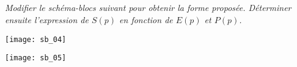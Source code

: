 \begin{multicols}{2}
\subparagraph*{}
\textit{Modifier le schéma-blocs suivant pour obtenir la forme proposée. Déterminer ensuite l'expression de $S(p)$ en fonction de $E(p)$ et $P(p)$.}
\begin{center}
\texttt{[image: sb\_04]}
\end{center}

\begin{center}
\texttt{[image: sb\_05]}
\end{center}

\end{multicols}

